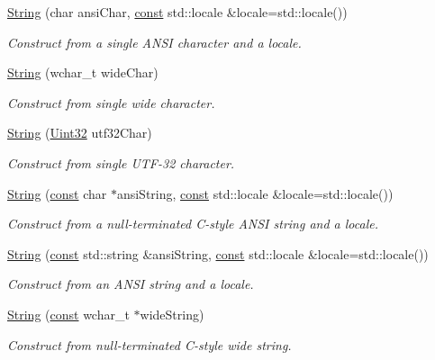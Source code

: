 \begin{DoxyCompactItemize}
\hyperlink{classsf_1_1_string_ac9df7f7696cff164794e338f3c89ccc5}{String} (char ansi\-Char, \hyperlink{term__entry_8h_a57bd63ce7f9a353488880e3de6692d5a}{const} std\-::locale \&locale=std\-::locale())
\begin{DoxyCompactList}\small\item\em Construct from a single A\-N\-S\-I character and a locale. \end{DoxyCompactList}\item 
\hyperlink{classsf_1_1_string_aefaa202d2aa5ff85b4f75a5983367e86}{String} (wchar\-\_\-t wide\-Char)
\begin{DoxyCompactList}\small\item\em Construct from single wide character. \end{DoxyCompactList}\item 
\hyperlink{classsf_1_1_string_a8e1a5027416d121187908e2ed77079ff}{String} (\hyperlink{namespacesf_aa746fb1ddef4410bddf198ebb27e727c}{Uint32} utf32\-Char)
\begin{DoxyCompactList}\small\item\em Construct from single U\-T\-F-\/32 character. \end{DoxyCompactList}\item 
\hyperlink{classsf_1_1_string_a57d2b8c289f9894f859564cad034bfc7}{String} (\hyperlink{term__entry_8h_a57bd63ce7f9a353488880e3de6692d5a}{const} char $\ast$ansi\-String, \hyperlink{term__entry_8h_a57bd63ce7f9a353488880e3de6692d5a}{const} std\-::locale \&locale=std\-::locale())
\begin{DoxyCompactList}\small\item\em Construct from a null-\/terminated C-\/style A\-N\-S\-I string and a locale. \end{DoxyCompactList}\item 
\hyperlink{classsf_1_1_string_a0aa41dcbd17b0c36c74d03d3b0147f1e}{String} (\hyperlink{term__entry_8h_a57bd63ce7f9a353488880e3de6692d5a}{const} std\-::string \&ansi\-String, \hyperlink{term__entry_8h_a57bd63ce7f9a353488880e3de6692d5a}{const} std\-::locale \&locale=std\-::locale())
\begin{DoxyCompactList}\small\item\em Construct from an A\-N\-S\-I string and a locale. \end{DoxyCompactList}\item 
\hyperlink{classsf_1_1_string_a5742d0a9b0c754f711820c2b5c40fa55}{String} (\hyperlink{term__entry_8h_a57bd63ce7f9a353488880e3de6692d5a}{const} wchar\-\_\-t $\ast$wide\-String)
\begin{DoxyCompactList}\small\item\em Construct from null-\/terminated C-\/style wide string. \end{DoxyCompactList}\item 

\end{DoxyCompactItemize}
